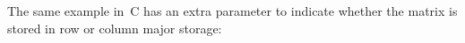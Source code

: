The same example in~C has an extra parameter to indicate whether the matrix
is stored in row or column major storage:
%



